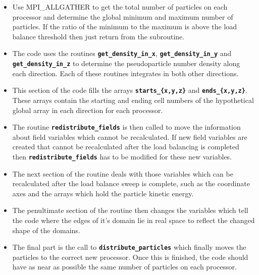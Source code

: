 \documentclass[12pt,a4paper]{article}
\newcommand{\inlinecode}[1]{{\color{warwickred} \bf\texttt{#1}}}
\begin{document}
\begin{itemize}
\item Use MPI\_ALLGATHER to get the total number of particles on each processor
  and determine the global minimum and maximum number of particles. If the
  ratio of the minimum to the maximum is above the load balance threshold then
  just return from the subroutine.
\item The code uses the routines \inlinecode{get\_density\_in\_x},
  \inlinecode{get\_density\_in\_y} and \inlinecode{get\_density\_in\_z} to determine the
  pseudoparticle number density along each direction. Each of these routines
  integrates in both other directions.
\item This section of the code fills the arrays \inlinecode{starts\_\{x,y,z\}}
  and \inlinecode{ends\_\{x,y,z\}}. These arrays contain the starting and
  ending cell numbers of the hypothetical global array in each direction for
  each processor.
\item The routine \inlinecode{redistribute\_fields} is then called to move the
  information about field variables which cannot be recalculated. If new field
  variables are created that cannot be recalculated after the load balancing is
  completed then \inlinecode{redistribute\_fields} has to be modified for these
  new variables.
\item The next section of the routine deals with those variables which can be
  recalculated after the load balance sweep is complete, such as the coordinate
  axes and the arrays which hold the particle kinetic energy.
\item The penultimate section of the routine then changes the variables which
  tell the code where the edges of it's domain lie in real space to reflect the
  changed shape of the domains.
\item The final part is the call to \inlinecode{distribute\_particles} which
  finally moves the particles to the correct new processor. Once this is
  finished, the code should have as near as possible the same number of
  particles on each processor.
\end{itemize}
\end{document}
